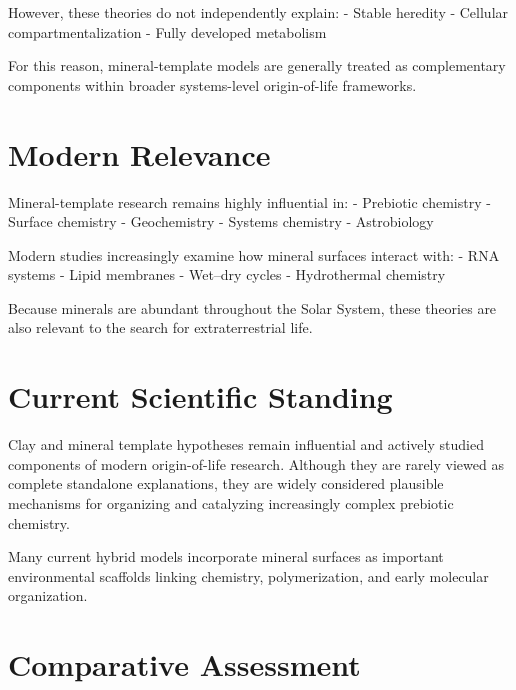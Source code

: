 \documentclass[
  oneside]{book}
\begin{document}
However, these theories do not independently explain:
- Stable heredity
- Cellular compartmentalization
- Fully developed metabolism

For this reason, mineral-template models are generally treated as complementary components within broader systems-level origin-of-life frameworks.

\section{Modern Relevance}\label{modern-relevance-5}

Mineral-template research remains highly influential in:
- Prebiotic chemistry
- Surface chemistry
- Geochemistry
- Systems chemistry
- Astrobiology

Modern studies increasingly examine how mineral surfaces interact with:
- RNA systems
- Lipid membranes
- Wet--dry cycles
- Hydrothermal chemistry

Because minerals are abundant throughout the Solar System, these theories are also relevant to the search for extraterrestrial life.

\section{Current Scientific Standing}\label{current-scientific-standing-5}

Clay and mineral template hypotheses remain influential and actively studied components of modern origin-of-life research. Although they are rarely viewed as complete standalone explanations, they are widely considered plausible mechanisms for organizing and catalyzing increasingly complex prebiotic chemistry.

Many current hybrid models incorporate mineral surfaces as important environmental scaffolds linking chemistry, polymerization, and early molecular organization.

\section{Comparative Assessment}\label{comparative-assessment-5}
\end{document}
